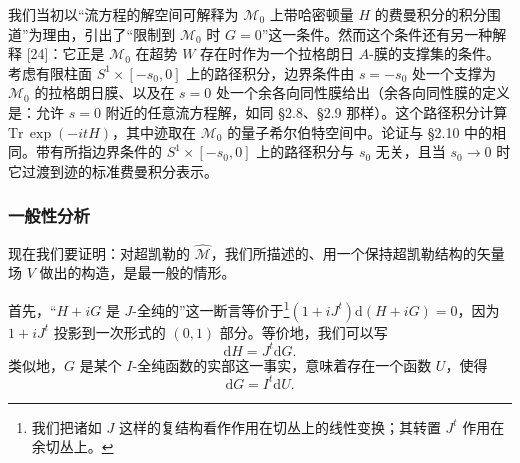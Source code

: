 \documentclass[11pt,a4paper,UTF8]{ctexart}
\theoremstyle{plain}
\theoremstyle{definition}
\begin{document}

我们当初以“流方程的解空间可解释为 $\mathcal{M}_0$ 上带哈密顿量 $H$ 的费曼积分的积分围道”为理由，引出了“限制到 $\mathcal{M}_0$ 时 $G=0$”这一条件。然而这个条件还有另一种解释 [24]：它正是 $\mathcal{M}_0$ 在超势 $W$ 存在时作为一个拉格朗日 $A$-膜的支撑集的条件。考虑有限柱面 $S^1\times[-s_0,0]$ 上的路径积分，边界条件由 $s=-s_0$ 处一个支撑为 $\mathcal{M}_0$ 的拉格朗日膜、以及在 $s=0$ 处一个余各向同性膜给出（余各向同性膜的定义是：允许 $s=0$ 附近的任意流方程解，如同 §2.8、§2.9 那样）。这个路径积分计算 $\mathrm{Tr}\,\exp(-itH)$，其中迹取在 $\mathcal{M}_0$ 的量子希尔伯特空间中。论证与 §2.10 中的相同。带有所指边界条件的 $S^1\times[-s_0,0]$ 上的路径积分与 $s_0$ 无关，且当 $s_0\to0$ 时它过渡到迹的标准费曼积分表示。

\subsubsection{一般性分析}

现在我们要证明：对超凯勒的 $\widehat{\mathcal{M}}$，我们所描述的、用一个保持超凯勒结构的矢量场 $V$ 做出的构造，是最一般的情形。

首先，“$H+iG$ 是 $J$-全纯的”这一断言等价于\footnote{我们把诸如 $J$ 这样的复结构看作作用在切丛上的线性变换；其转置 $J^t$ 作用在余切丛上。}$(1+iJ^t)\mathrm{d}(H+iG)=0$，因为 $1+iJ^t$ 投影到一次形式的 $(0,1)$ 部分。等价地，我们可以写
\begin{equation}
    \mathrm{d}H=J^t\mathrm{d}G.
    \tag{3.21}
\end{equation}
类似地，$G$ 是某个 $I$-全纯函数的实部这一事实，意味着存在一个函数 $U$，使得
\begin{equation}
    \mathrm{d}G=I^t\mathrm{d}U.
    \tag{3.22}
\end{equation}

\end{document}
